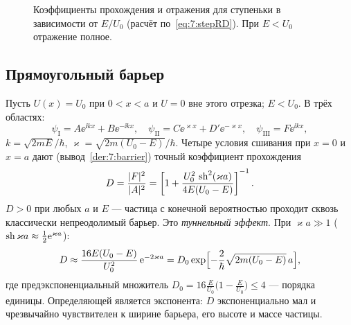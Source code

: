 \begin{figure}[htbp]
\centering
{}
\caption{Коэффициенты прохождения и отражения для ступеньки в зависимости от $E/U_0$
(расчёт по~\eqref{eq:7:stepRD}). При $E<U_0$ отражение полное.}
\label{fig:7:stepD}
\end{figure}

\subsection{Прямоугольный барьер}

Пусть $U(x)=U_0$ при $0<x<a$ и $U=0$ вне этого отрезка; $E<U_0$. В трёх областях:
\[
  \psi_{\mathrm I}=A\ee^{\ii kx}+B\ee^{-\ii kx},\quad
  \psi_{\mathrm{II}}=C\ee^{\varkappa x}+D'\ee^{-\varkappa x},\quad
  \psi_{\mathrm{III}}=F\ee^{\ii kx},
\]
$k=\sqrt{2mE}/\hbar$, $\varkappa=\sqrt{2m(U_0-E)}/\hbar$. Четыре условия сшивания при $x=0$ и $x=a$
дают (вывод~\ref{der:7:barrier}) точный коэффициент прохождения
\begin{equation}\label{eq:7:Dexact}
  D=\frac{|F|^2}{|A|^2}=\left[1+\frac{U_0^2\,\operatorname{sh}^2(\varkappa a)}{4E(U_0-E)}\right]^{-1}.
\end{equation}
$D>0$ при любых $a$ и $E$ — частица с конечной вероятностью проходит сквозь классически
непреодолимый барьер. Это \emph{туннельный эффект}. При $\varkappa a\gg1$ ($\operatorname{sh}\varkappa a\approx\frac12\mathrm{e}^{\varkappa a}$):
\begin{equation}\label{eq:7:Dthick}
  D\approx\frac{16E(U_0-E)}{U_0^2}\,\mathrm{e}^{-2\varkappa a}=D_0\exp\Bigl[-\frac2\hbar\sqrt{2m(U_0-E)}\,a\Bigr],
\end{equation}
где предэкспоненциальный множитель $D_0=16\frac{E}{U_0}\bigl(1-\frac{E}{U_0}\bigr)\le4$ — порядка единицы.
Определяющей является экспонента: $D$ экспоненциально мал и чрезвычайно чувствителен к ширине
барьера, его высоте и массе частицы.

